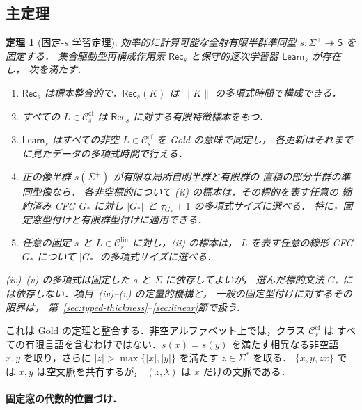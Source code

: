 \documentclass[11pt,a4paper]{ltjsarticle}
\newtheorem{theorem}{定理}[section]
\theoremstyle{remark}
\theoremstyle{plain}
\newcommand{\cf}{\mathrm{cf}}
\newcommand{\lin}{\mathrm{lin}}
\newcommand{\Ccf}[1]{\mathcal C_{#1}^{\cf}}
\newcommand{\Clin}[1]{\mathcal C_{#1}^{\lin}}
\begin{document}
\subsection{主定理}

\begin{theorem}[固定-$s$ 学習定理]\label{thm:main}
効率的に計算可能な全射有限半群準同型
$s:\Sigma^+\twoheadrightarrow\mathsf S$ を固定する．
集合駆動型再構成作用素 $\mathsf{Rec}_s$ と保守的逐次学習器 $\mathsf{Learn}_s$ が存在し，
次を満たす．
\begin{enumerate}[label=\textup{(\roman*)},nosep]
\item $\mathsf{Rec}_s$ は標本整合的で，$\mathsf{Rec}_s(K)$ は $\|K\|$ の多項式時間で構成できる．
\item すべての $L\in\Ccf{s}$ は $\mathsf{Rec}_s$ に対する有限特徴標本をもつ．
\item $\mathsf{Learn}_s$ はすべての非空 $L\in\Ccf{s}$ を Gold の意味で同定し，
各更新はそれまでに見たデータの多項式時間で行える．
\item 正の像半群 $s(\Sigma^+)$ が有限な局所自明半群と有限群の
直積の部分半群の準同型像なら，
各非空標的について (ii) の標本は，その標的を表す任意の
縮約済み CFG $G_*$ に対し $|G_*|$ と $\tau_{G_*}+1$ の多項式サイズに選べる．
特に，固定窓型付けと有限群型付けに適用できる．
\item 任意の固定 $s$ と $L\in\Clin{s}$ に対し，(ii) の標本は，
$L$ を表す任意の線形 CFG $G_*$ について $|G_*|$ の多項式サイズに選べる．
\end{enumerate}
(iv)--(v) の多項式は固定した $s$ と $\Sigma$ に依存してよいが，
選んだ標的文法 $G_*$ には依存しない．項目~(iv)--(v) の定量的機構と，
一般の固定型付けに対するその限界は，
第~\ref{sec:typed-thickness}--\ref{sec:linear}節で扱う．
\end{theorem}

これは Gold の定理と整合する．非空アルファベット上では，クラス $\Ccf{s}$ は
すべての有限言語を含むわけではない．$s(x)=s(y)$ を満たす相異なる非空語
$x,y$ を取り，さらに
$|z|>\max\{|x|,|y|\}$ を満たす $z\in\Sigma^*$ を取る．
$\{x,y,zx\}$ では $x,y$ は空文脈を共有するが，
$(z,\lambda)$ は $x$ だけの文脈である．

\paragraph{固定窓の代数的位置づけ．}
\end{document}
